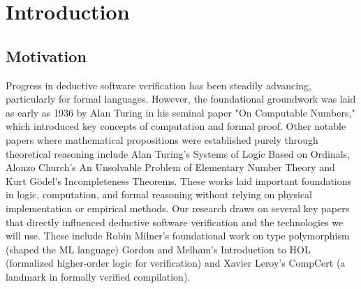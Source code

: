 
%

\chapter{Introduction}
\label{cha:introduction}


\section{Motivation}
\label{sec:Motivation}


Progress in deductive software verification has been steadily advancing, particularly for formal languages. 
However, the foundational groundwork was laid as early as 1936 by Alan Turing in his seminal paper "On Computable Numbers," 
which introduced key concepts of computation and formal proof. Other notable papers where mathematical propositions were 
established purely through theoretical reasoning include Alan Turing's Systems of Logic Based on Ordinals, Alonzo Church's 
An Unsolvable Problem of Elementary Number Theory and Kurt Gödel's Incompleteness Theorems. These works laid important 
foundations in logic, computation, and formal reasoning without relying on physical implementation or empirical methods.
Our research draws on several key papers that directly influenced deductive software verification and the technologies 
we will use. These include Robin Milner's foundational work on type polymorphism (shaped the ML language) Gordon and 
Melham's Introduction to HOL (formalized higher-order logic for verification) and Xavier Leroy's CompCert (a landmark 
in formally verified compilation). 

